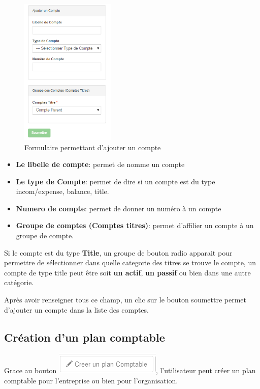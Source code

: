 \documentclass[12pt,a4paper]{report}
\begin{document}
\begin{figure}[h]
\begin{center}
\includegraphics[width=4.5cm]{pic/FormAddCompte.png}
\end{center}
\caption{Formulaire permettant d'ajouter un compte}
\label{Formulaire permettant d'ajouter un compte}
\end{figure}

\begin{itemize}
\item \textbf{Le libelle de compte}: permet de nomme un compte \\
\item \textbf{Le type de Compte}: permet de dire si un compte est du type incom/expense, balance, title.\\
\item \textbf{Numero de compte}: permet de donner un numéro à un compte \\
\item \textbf{Groupe de comptes (Comptes titres)}: permet d'affilier un compte à un groupe de compte.\\
\end{itemize}

Si le compte est du type \textbf{Title}, un groupe de bouton radio apparait pour permettre de sélectionner dans quelle categorie des titres se trouve le compte, un compte de type title peut être soit \textbf{un actif}, \textbf{un passif} ou bien dans une autre catégorie.

Après avoir renseigner tous ce champ, un clic sur le bouton soumettre permet d'ajouter un compte dans la liste des comptes.
 
\subsection{Création d'un plan comptable}
Grace au bouton \includegraphics[scale=0.7]{pic/CreePlanCompt.png}, l'utilisateur peut créer un plan comptable pour l'entreprise ou bien pour l'organisation. \\
\end{document}
